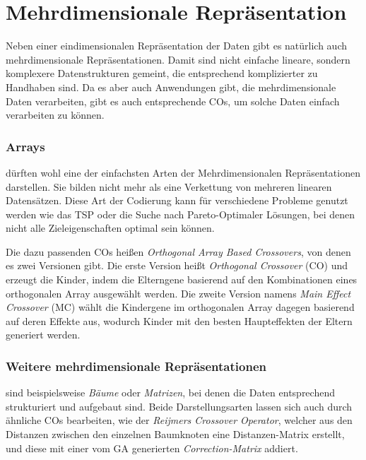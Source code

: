 
\section{Mehrdimensionale Repräsentation}
\label{sec:MehrdimRep}

	Neben einer eindimensionalen Repräsentation der Daten gibt es natürlich auch mehrdimensionale Repräsentationen. Damit sind nicht einfache lineare, sondern komplexere Datenstrukturen gemeint, die entsprechend komplizierter zu Handhaben sind. Da es aber auch Anwendungen gibt, die mehrdimensionale Daten verarbeiten, gibt es auch entsprechende COs, um solche Daten einfach verarbeiten zu können.
	
	\subsubsection{Arrays}
	\label{sec:Arrays}
	
		dürften wohl eine der einfachsten Arten der Mehrdimensionalen Re\-prä\-sen\-ta\-ti\-on\-en darstellen. Sie bilden nicht mehr als eine Verkettung von mehreren linearen Datensätzen. Diese Art der Codierung kann für verschiedene Probleme genutzt werden wie \zB das TSP oder die Suche nach Pareto-Optimaler Lösungen, bei denen nicht alle Zieleigenschaften optimal sein können.
		
		Die dazu passenden COs heißen \uA \textit{Orthogonal Array Based Crossovers}, von denen es zwei Versionen gibt. Die erste Version heißt \textit{Orthogonal Crossover} (CO) und erzeugt die Kinder, indem die Elterngene basierend auf den Kombinationen eines orthogonalen Array ausgewählt werden. Die zweite Version namens \textit{Main Effect Crossover} (MC) wählt die Kindergene im orthogonalen Array dagegen basierend auf deren Effekte aus, wodurch Kinder mit den besten Haupteffekten der Eltern generiert werden. \cite{ArrayCrossover}
	
	\subsubsection{Weitere mehrdimensionale Repräsentationen}
	\label{sec:WeitereMehrdim}
	
		sind beispielsweise \textit{Bäume} oder \textit{Matrizen}, bei denen die Daten entsprechend strukturiert und aufgebaut sind. Beide Darstellungsarten lassen sich \uA auch durch ähnliche COs bearbeiten, wie \zB der \textit{Reijmers Crossover Operator}, welcher aus den Distanzen zwischen den einzelnen Baumknoten eine Distanzen-Matrix erstellt, und diese mit einer vom GA generierten \textit{Correction-Matrix} addiert. \cite{MatrixCO}

